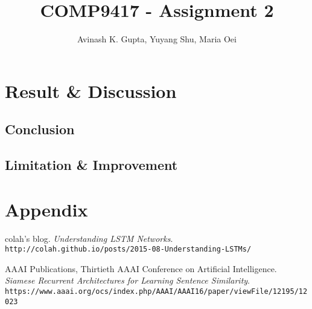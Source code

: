 \documentclass[11pt, oneside]{article}   	%
\title{COMP9417 - Assignment 2}
\author{Avinash K. Gupta, Yuyang Shu, Maria Oei}
\begin{document}
\maketitle


\newpage
\tableofcontents
\newpage

\justify






\section{Result \& Discussion}

\subsection{Conclusion}
\subsection{Limitation \& Improvement}

\section{Appendix}











\newpage

\medskip
 
\begin{thebibliography}{9}

colah's blog.
\textit{Understanding LSTM Networks}.
\\\texttt{http://colah.github.io/posts/2015-08-Understanding-LSTMs/}

AAAI Publications, Thirtieth AAAI Conference on Artificial Intelligence.
\textit{Siamese Recurrent Architectures for Learning Sentence Similarity}.
\\\texttt{https://www.aaai.org/ocs/index.php/AAAI/AAAI16/paper/viewFile/12195/12023}


\end{thebibliography}
\end{document}
